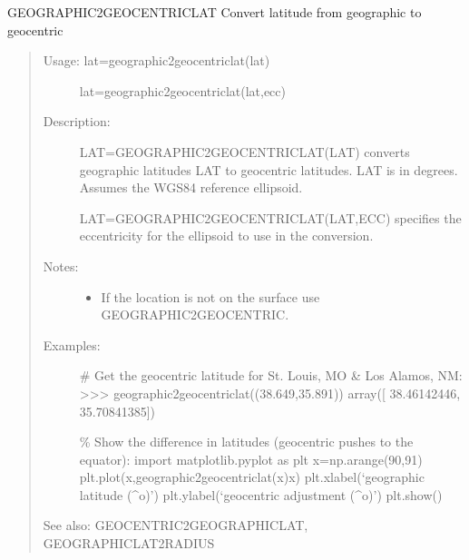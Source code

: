 \documentclass[letterpaper,10pt,english]{sphinxmanual}
\begin{document}

\begin{fulllineitems}
\label{\detokenize{infrapy.utils:infrapy.utils.latlon.geographic2geocentriclat}}
GEOGRAPHIC2GEOCENTRICLAT    Convert latitude from geographic to geocentric
\begin{quote}
\begin{description}
\item[{Usage:    lat=geographic2geocentriclat(lat)}] \leavevmode
lat=geographic2geocentriclat(lat,ecc)

\item[{Description:}] \leavevmode
LAT=GEOGRAPHIC2GEOCENTRICLAT(LAT) converts geographic latitudes LAT to
geocentric latitudes.  LAT is in degrees.  Assumes the WGS\sphinxhyphen{}84 reference
ellipsoid.

LAT=GEOGRAPHIC2GEOCENTRICLAT(LAT,ECC) specifies the eccentricity for
the ellipsoid to use in the conversion.

\item[{Notes:}] \leavevmode\begin{itemize}
\item {} 
If the location is not on the surface use GEOGRAPHIC2GEOCENTRIC.

\end{itemize}

\item[{Examples:}] \leavevmode
\# Get the geocentric latitude for St. Louis, MO \& Los Alamos, NM:
\textgreater{}\textgreater{}\textgreater{} geographic2geocentriclat((38.649,35.891))
array({[} 38.46142446,  35.70841385{]})

\% Show the difference in latitudes (geocentric pushes to the equator):
import matplotlib.pyplot as plt
x=np.arange(\sphinxhyphen{}90,91)
plt.plot(x,geographic2geocentriclat(x)\sphinxhyphen{}x)
plt.xlabel(‘geographic latitude (\textasciicircum{}o)’)
plt.ylabel(‘geocentric adjustment (\textasciicircum{}o)’)
plt.show()

\end{description}

See also: GEOCENTRIC2GEOGRAPHICLAT, GEOGRAPHICLAT2RADIUS
\end{quote}

\end{fulllineitems}
\end{document}
